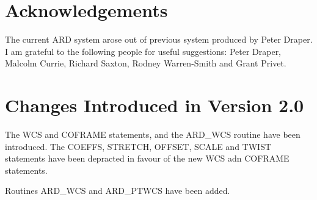 \section{Acknowledgements}

The current ARD system arose out of previous system produced by Peter Draper. I
am grateful to the following people for useful suggestions: Peter Draper,
Malcolm Currie, Richard Saxton, Rodney Warren-Smith and Grant Privet. 

\section{Changes Introduced in Version 2.0}
The WCS and COFRAME statements, and the ARD\_WCS routine have been introduced.
The COEFFS, STRETCH, OFFSET, SCALE and TWIST statements have been
depracted in favour of the new WCS adn COFRAME statements.

Routines ARD\_WCS and ARD\_PTWCS have been added.


